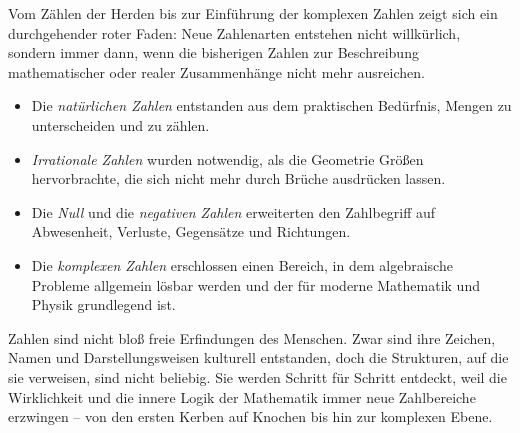 Vom Zählen der Herden bis zur Einführung der komplexen Zahlen
zeigt sich ein durchgehender roter Faden:
Neue Zahlenarten entstehen nicht willkürlich,
sondern immer dann, wenn die bisherigen Zahlen
zur Beschreibung mathematischer oder realer Zusammenhänge nicht mehr ausreichen.

\begin{itemize}
	\item Die \emph{natürlichen Zahlen}
	entstanden aus dem praktischen Bedürfnis, Mengen zu unterscheiden und zu zählen.
	\item \emph{Irrationale Zahlen}
	wurden notwendig, als die Geometrie Größen hervorbrachte,
	die sich nicht mehr durch Brüche ausdrücken lassen.
	\item Die \emph{Null}
	und die \emph{negativen Zahlen}
	erweiterten den Zahlbegriff auf Abwesenheit, Verluste, Gegensätze und Richtungen.
	\item Die \emph{komplexen Zahlen}
	erschlossen einen Bereich, in dem algebraische Probleme
	allgemein lösbar werden und der für moderne Mathematik und Physik grundlegend ist.
\end{itemize}

\begin{NoteBox}
	\label{box:universelle}
	Zahlen sind nicht bloß freie Erfindungen des Menschen.
	Zwar sind ihre Zeichen, Namen und Darstellungsweisen kulturell entstanden,
	doch die Strukturen, auf die sie verweisen, sind nicht beliebig.
	Sie werden Schritt für Schritt entdeckt,
	weil die Wirklichkeit und die innere Logik der Mathematik
	immer neue Zahlbereiche erzwingen --
	von den ersten Kerben auf Knochen
	bis hin zur komplexen Ebene.
	\label{box:universelle}
\end{NoteBox}